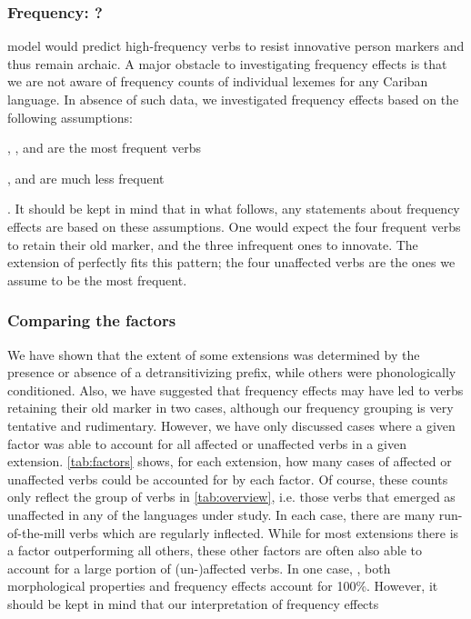 \subsubsection{Frequency: \PWai?}
\label{sec:frequency}
 model would predict high-frequency verbs to resist innovative person markers and thus remain archaic.
A major obstacle to investigating frequency effects is that we are not aware of frequency counts of individual lexemes for any Cariban language.
In absence of such data, we investigated frequency effects based on the following assumptions:
\begin{inlinelist}
	\item {}, , and  are the most frequent  verbs
	\item {},  and  are much less frequent
\end{inlinelist}.
It should be kept in mind that in what follows, any statements about frequency effects are based on these assumptions.
One would expect the four frequent verbs to retain their old marker, and the three infrequent ones to innovate.
The extension of \PWai {} perfectly fits this pattern; the four unaffected  verbs are the ones we assume to be the most frequent.

\subsubsection{Comparing the factors}
\label{sec:convergence}
We have shown that the extent of some extensions was determined by the presence or absence of a detransitivizing prefix, while others were phonologically conditioned.
Also, we have suggested that frequency effects may have led to verbs retaining their old marker in two cases, although our frequency grouping is very tentative and rudimentary.
However, we have only discussed cases where a given factor was able to account for all affected or unaffected verbs in a given extension.
\cref{tab:factors} shows, for each extension, how many cases of affected or unaffected verbs could be accounted for by each factor.
Of course, these counts only reflect the group of verbs in \cref{tab:overview}, i.e. those verbs that emerged as unaffected in any of the languages under study.
In each case, there are many run-of-the-mill  verbs which are regularly inflected.
While for most extensions there is a factor outperforming all others, these other factors are often also able to account for a large portion of (un-)affected verbs.
In one case, \PWai, both morphological properties and frequency effects account for 100\%.
However, it should be kept in mind that our interpretation of frequency effects


